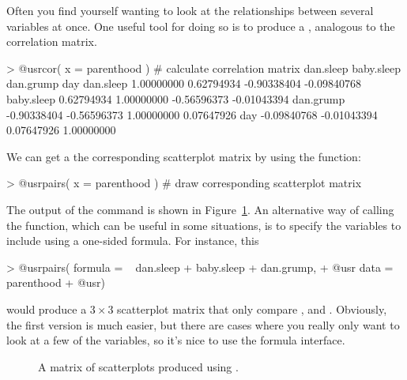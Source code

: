 Often you find yourself wanting to look at the relationships between several variables at once. One useful tool for doing so is to produce a , analogous to the correlation matrix. 
\begin{rblock1}
> @usr{cor( x = parenthood )} # calculate correlation matrix
             dan.sleep  baby.sleep   dan.grump         day
dan.sleep   1.00000000  0.62794934 -0.90338404 -0.09840768
baby.sleep  0.62794934  1.00000000 -0.56596373 -0.01043394
dan.grump  -0.90338404 -0.56596373  1.00000000  0.07647926
day        -0.09840768 -0.01043394  0.07647926  1.00000000
\end{rblock1}
We can get a the corresponding scatterplot matrix by using the  function:
\begin{rblock1}
> @usr{pairs( x = parenthood )} # draw corresponding scatterplot matrix  
\end{rblock1}
The output of the  command is shown in Figure~\ref{fig:pairs}.  An alternative way of calling the  function, which can be useful in some situations, is to specify the variables to include using a one-sided formula. For instance, this
\begin{rblock1}
> @usr{pairs( formula = ~ dan.sleep + baby.sleep + dan.grump,}
+ @usr{       data = parenthood}
+ @usr{)}
\end{rblock1}
would produce a $3 \times 3$ scatterplot matrix that only compare ,  and . Obviously, the first version is much easier, but there are cases where you really only want to look at a few of the variables, so it's nice to use the formula interface.


\begin{figure}
\begin{center}
\caption{A matrix of scatterplots produced using .}
\HR
\label{fig:pairs}
\end{center}
\end{figure}





